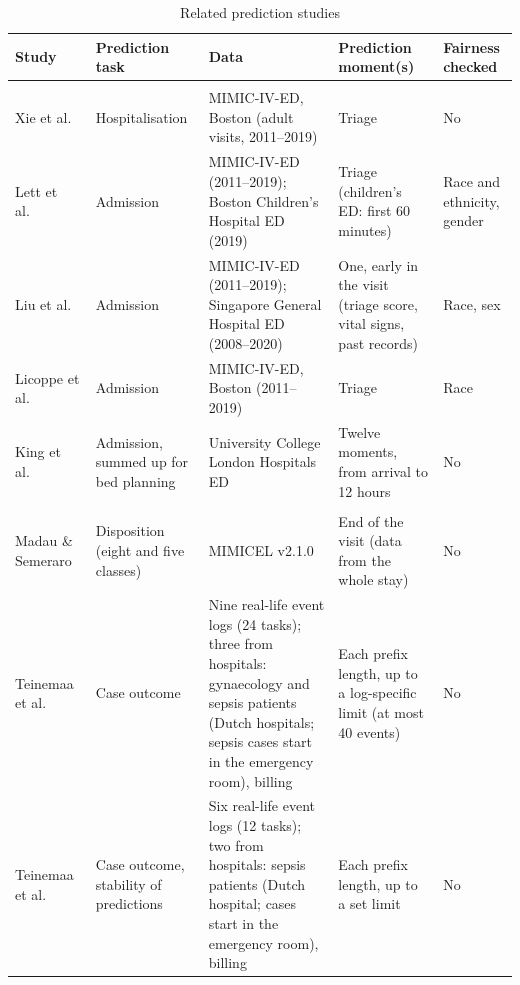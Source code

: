 \begin{table}[htbp]
  \centering
  \footnotesize
  \caption{Related prediction studies}\label{table::prediction_work}
  \begin{tabularx}{\textwidth}{@{}>{\raggedright\arraybackslash}p{2.3cm}>{\raggedright\arraybackslash}p{2.4cm}>{\raggedright\arraybackslash}X>{\raggedright\arraybackslash}p{3.0cm}>{\raggedright\arraybackslash}p{2.1cm}@{}}
    \toprule
    \textbf{Study} & \textbf{Prediction task} & \textbf{Data} & \textbf{Prediction moment(s)} & \textbf{Fairness checked} \\
    \midrule
    \multicolumn{5}{@{}l}{\textit{Admission prediction in the ED}} \\
    Xie et al.~\cite{xie2022benchmarking} & Hospitalisation & MIMIC-IV-ED, Boston (adult visits, 2011--2019) & Triage & No \\
    Lett et al.~\cite{lett2025intersectional} & Admission & MIMIC-IV-ED (2011--2019); Boston Children's Hospital ED (2019) & Triage (children's ED: first 60 minutes) & Race and ethnicity, gender \\
    Liu et al.~\cite{liu2024faim} & Admission & MIMIC-IV-ED (2011--2019); Singapore General Hospital ED (2008--2020) & One, early in the visit (triage score, vital signs, past records) & Race, sex \\
    Licoppe et al.~\cite{licoppe2026assessing} & Admission & MIMIC-IV-ED, Boston (2011--2019) & Triage & Race \\
    King et al.~\cite{king2022machine} & Admission, summed up for bed planning & University College London Hospitals ED & Twelve moments, from arrival to 12 hours & No \\
    \midrule
    \multicolumn{5}{@{}l}{\textit{Process mining and predictive process monitoring}} \\
    Madau \& Semeraro~\cite{madau2025process} & Disposition (eight and five classes) & MIMICEL v2.1.0 & End of the visit (data from the whole stay) & No \\
    Teinemaa et al.~\cite{teinemaa2019outcome} & Case outcome & Nine real-life event logs (24 tasks); three from hospitals: gynaecology and sepsis patients (Dutch hospitals; sepsis cases start in the emergency room), billing & Each prefix length, up to a log-specific limit (at most 40 events) & No \\
    Teinemaa et al.~\cite{teinemaa2018temporal} & Case outcome, stability of predictions & Six real-life event logs (12 tasks); two from hospitals: sepsis patients (Dutch hospital; cases start in the emergency room), billing & Each prefix length, up to a set limit & No \\

\end{tabularx}
\end{table}
